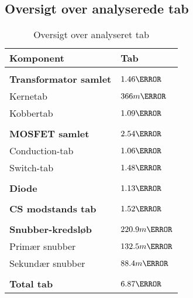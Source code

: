 \subsection{Oversigt over analyserede tab}
\begin{table}[H] 			
	\centering
	\begin{tabularx}{\textwidth}{|X|l|}
		\hline
		\textbf{\large Komponent} & \textbf{\large Tab} \\ \hline
		&  	\\ \hline
		\textbf{Transformator samlet} & $1.46\watt$  	\\ \hline 
		Kernetab & $366m\watt$  						\\ \hline
		Kobbertab & $1.09\watt$  						\\ \hline
		& 	\\ \hline
		\textbf{MOSFET samlet} & $2.54\watt$  			\\ \hline
		Conduction-tab & $1.06\watt$  					\\ \hline
		Switch-tab & $1.48\watt$  						\\ \hline
		& 	\\ \hline
		\textbf{Diode} & $1.13\watt$  					\\ \hline
		& 	\\ \hline
		\textbf{CS modstands tab} & $1.52\watt$  		\\ \hline
		& 	\\ \hline
		\textbf{Snubber-kredsløb} & $220.9m\watt$  		\\ \hline
		Primær snubber	& $132.5m\watt$					\\ \hline
		Sekundær snubber &	$88.4m\watt$ 				\\ \hline
		& 	\\ \hline
		\textbf{Total tab} & $6.87\watt$ 		 		\\ \hline
	\end{tabularx}
	\caption{Oversigt over analyseret tab}
	\label{tab:analyse_tab_3}
\end{table}
 